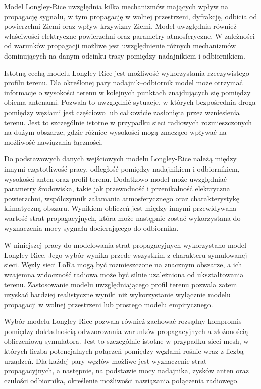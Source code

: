 \documentclass[12pt,a4paper,twoside]{report}
\theoremstyle{definition} %
\begin{document}
Model Longley-Rice uwzględnia kilka mechanizmów mających wpływ na propagację sygnału, w tym propagację w wolnej przestrzeni, dyfrakcję, odbicia od powierzchni Ziemi oraz wpływ krzywizny Ziemi. Model uwzględnia również właściwości elektryczne powierzchni oraz parametry atmosferyczne. W zależności od warunków propagacji możliwe jest uwzględnienie różnych mechanizmów dominujących na danym odcinku trasy pomiędzy nadajnikiem i odbiornikiem.

Istotną cechą modelu Longley-Rice jest możliwość wykorzystania rzeczywistego profilu terenu. Dla określonej pary nadajnik--odbiornik model może otrzymać informacje o wysokości terenu w kolejnych punktach znajdujących się pomiędzy obiema antenami. Pozwala to uwzględnić sytuacje, w których bezpośrednia droga pomiędzy węzłami jest częściowo lub całkowicie zasłonięta przez wzniesienia terenu. Jest to szczególnie istotne w przypadku sieci radiowych rozmieszczonych na dużym obszarze, gdzie różnice wysokości mogą znacząco wpływać na możliwość nawiązania łączności.

Do podstawowych danych wejściowych modelu Longley-Rice należą między innymi częstotliwość pracy, odległość pomiędzy nadajnikiem i odbiornikiem, wysokości anten oraz profil terenu. Dodatkowo model może uwzględniać parametry środowiska, takie jak przewodność i przenikalność elektryczna powierzchni, współczynnik załamania atmosferycznego oraz charakterystykę klimatyczną obszaru. Wynikiem obliczeń jest między innymi przewidywana wartość strat propagacyjnych, która może następnie zostać wykorzystana do wyznaczenia mocy sygnału docierającego do odbiornika.

W niniejszej pracy do modelowania strat propagacyjnych wykorzystano model Longley-Rice. Jego wybór wynika przede wszystkim z charakteru symulowanej sieci. Węzły sieci LoRa mogą być rozmieszczone na znacznym obszarze, a ich wzajemna widoczność radiowa może być silnie uzależniona od ukształtowania terenu. Zastosowanie modelu uwzględniającego profil terenu pozwala zatem uzyskać bardziej realistyczne wyniki niż wykorzystanie wyłącznie modelu propagacji w wolnej przestrzeni lub prostego modelu empirycznego.

Wybór modelu Longley-Rice pozwala również zachować rozsądny kompromis pomiędzy dokładnością odwzorowania warunków propagacyjnych a złożonością obliczeniową symulatora. Jest to szczególnie istotne w przypadku sieci mesh, w których liczba potencjalnych połączeń pomiędzy węzłami rośnie wraz z liczbą urządzeń. Dla każdej pary węzłów możliwe jest wyznaczenie strat propagacyjnych, a następnie, na podstawie mocy nadajnika, zysków anten oraz czułości odbiornika, określenie możliwości nawiązania połączenia radiowego.
\end{document}
